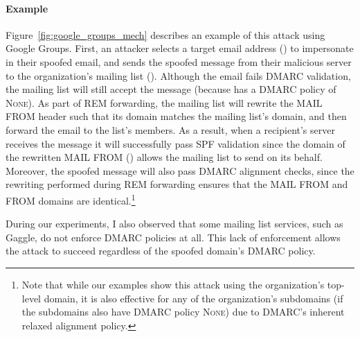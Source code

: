 \paragraph{Example}
Figure~\ref{fig:google_groups_mech} describes an example of this attack
using Google Groups.
First, an attacker selects a target email address () to impersonate in their spoofed email,
and sends the spoofed message from their malicious server to the organization's mailing list ().
Although the email fails DMARC validation,
the mailing list will still accept the message (because 
has a DMARC policy of \textsc{None}).
As part of REM forwarding, the mailing list will rewrite the
\textsc{MAIL FROM} header such that its domain matches the mailing
list's domain, and then forward the email to the list's members.
As a result, when a recipient's server receives the message it will
successfully pass SPF validation since the domain of the rewritten
\textsc{MAIL FROM} () allows the mailing list to send on
its behalf.
Moreover, the spoofed message will also pass DMARC alignment checks,
since the rewriting performed during REM forwarding
ensures that the \textsc{MAIL FROM} and \textsc{FROM} domains are
identical.\footnote{Note that while our examples show this attack
using the organization's top-level domain, it is also effective for
any of the organization's subdomains (if the subdomains also have
DMARC policy \textsc{None}) due to DMARC's inherent relaxed alignment policy.}

During our experiments, I also observed that some mailing list
services, such as Gaggle, do not enforce DMARC policies at all.
This lack of enforcement allows the attack to succeed regardless of the spoofed domain's DMARC policy.




